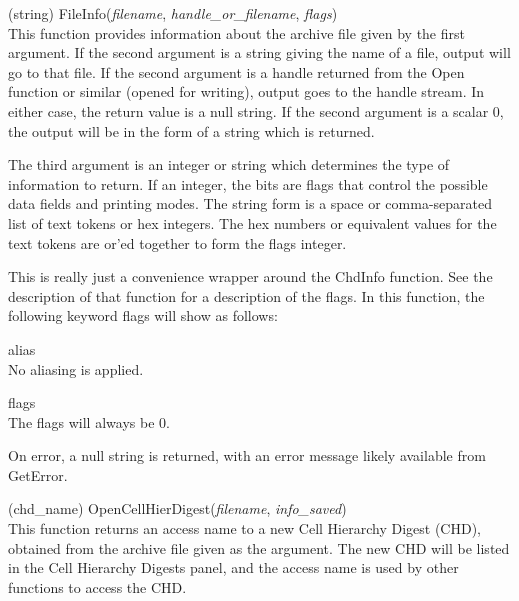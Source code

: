 \begin{description}
\item{(string) \vt FileInfo({\it filename\/}, {\it handle\_or\_filename\/},
  {\it flags\/})}\\
This function provides information about the archive file given by the
first argument.  If the second argument is a string giving the name of
a file, output will go to that file.  If the second argument is a
handle returned from the {\vt Open} function or similar (opened for
writing), output goes to the handle stream.  In either case, the
return value is a null string.  If the second argument is a scalar 0,
the output will be in the form of a string which is returned.

The third argument is an integer or string which determines the type
of information to return.  If an integer, the bits are flags that
control the possible data fields and printing modes.  The string form
is a space or comma-separated list of text tokens or hex integers. 
The hex numbers or equivalent values for the text tokens are or'ed
together to form the flags integer.
  
This is really just a convenience wrapper around the {\vt ChdInfo}
function.  See the description of that function for a description of
the flags.  In this function, the following keyword flags will show as
follows:

\begin{description}
\item{\vt alias}\\
No aliasing is applied.
\item{\vt flags}\\
The flags will always be 0.
\end{description}

On error, a null string is returned, with an error message likely
available from {\vt GetError}.

\item{(chd\_name) \vt OpenCellHierDigest({\it filename\/},
 {\it info\_saved\/})}\\
This function returns an access name to a new Cell Hierarchy Digest
(CHD), obtained from the archive file given as the argument.  The new
CHD will be listed in the {\cb Cell Hierarchy Digests} panel, and the
access name is used by other functions to access the CHD.


\end{description}
